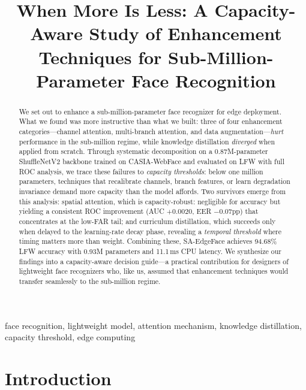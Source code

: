 \documentclass[journal,10pt]{IEEEtran}
\begin{document}
\title{When More Is Less: A Capacity-Aware Study of Enhancement Techniques for Sub-Million-Parameter Face Recognition}

\author{
}

\maketitle

\begin{abstract}
We set out to enhance a sub-million-parameter face recognizer for edge deployment. What we found was more instructive than what we built: three of four enhancement categories---channel attention, multi-branch attention, and data augmentation---\emph{hurt} performance in the sub-million regime, while knowledge distillation \emph{diverged} when applied from scratch. Through systematic decomposition on a 0.87M-parameter ShuffleNetV2 backbone trained on CASIA-WebFace and evaluated on LFW with full ROC analysis, we trace these failures to \emph{capacity thresholds}: below one million parameters, techniques that recalibrate channels, branch features, or learn degradation invariance demand more capacity than the model affords. Two survivors emerge from this analysis: spatial attention, which is capacity-robust: negligible for accuracy but yielding a consistent ROC improvement (AUC $+0.0020$, EER $-0.07$pp) that concentrates at the low-FAR tail; and curriculum distillation, which succeeds only when delayed to the learning-rate decay phase, revealing a \emph{temporal threshold} where timing matters more than weight. Combining these, SA-EdgeFace achieves 94.68\% LFW accuracy with 0.93M parameters and 11.1\,ms CPU latency. We synthesize our findings into a capacity-aware decision guide---a practical contribution for designers of lightweight face recognizers who, like us, assumed that enhancement techniques would transfer seamlessly to the sub-million regime.
\end{abstract}

\begin{IEEEkeywords}
face recognition, lightweight model, attention mechanism, knowledge distillation, capacity threshold, edge computing
\end{IEEEkeywords}

\section{Introduction}
\label{sec:intro}
\end{document}
